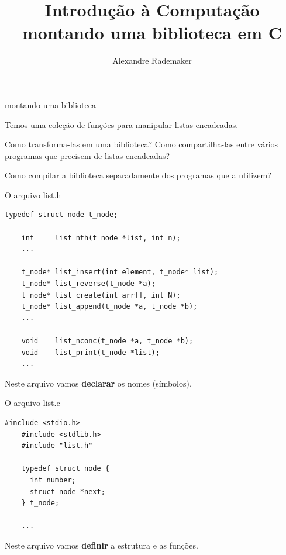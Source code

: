 \documentclass{beamer}
\title{Introdução à Computação \\ montando uma biblioteca em C}
\author{Alexandre Rademaker}
\date{}
\begin{document}
\begin{frame}
 \maketitle
\end{frame}

\begin{frame}{montando uma biblioteca}

  Temos uma coleção de funções para manipular listas encadeadas.

  Como transforma-las em uma biblioteca? Como compartilha-las entre
  vários programas que precisem de listas encadeadas?

  Como compilar a biblioteca separadamente dos programas que a
  utilizem?

\end{frame}


\begin{frame}[fragile]{O arquivo list.h}

  \begin{lstlisting}[style=normalc,caption=list/list.h]
    typedef struct node t_node;

    int     list_nth(t_node *list, int n);
    ...
    
    t_node* list_insert(int element, t_node* list);
    t_node* list_reverse(t_node *a);
    t_node* list_create(int arr[], int N);
    t_node* list_append(t_node *a, t_node *b);
    ...

    void    list_nconc(t_node *a, t_node *b);
    void    list_print(t_node *list);
    ...
  \end{lstlisting}

  Neste arquivo vamos \textbf{declarar} os nomes (símbolos).

\end{frame}


\begin{frame}[fragile]{O arquivo list.c}

  \begin{lstlisting}[style=normalc,caption=list/list.c]
    #include <stdio.h>
    #include <stdlib.h>
    #include "list.h"

    typedef struct node {
      int number;
      struct node *next;
    } t_node;

    ...
  \end{lstlisting}

  Neste arquivo vamos \textbf{definir} a estrutura e as funções.

\end{frame}
\end{document}
